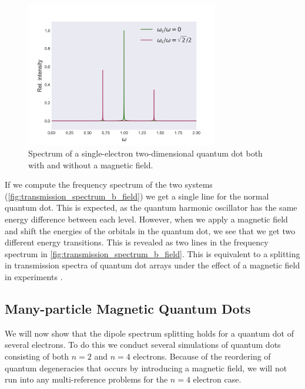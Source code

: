 \begin{figure}
    \centering
    \includegraphics[width=0.75\textwidth]{results/figures/transmission_spectrum.png}
    \caption{Spectrum of a single-electron two-dimensional quantum dot both with and
        without a magnetic field.
    }
    \label{fig:transmission_spectrum_b_field}
\end{figure}

If we compute the frequency spectrum of the two systems
(\autoref{fig:transmission_spectrum_b_field}) we get a single line for the 
normal quantum dot. This is expected, as the quantum harmonic oscillator has 
the same energy difference between each level. However, when we apply a magnetic
field and shift the energies of the orbitals in the quantum dot, we see that we 
get two different energy transitions. This is revealed as two lines in the 
frequency spectrum in \autoref{fig:transmission_spectrum_b_field}. This is equivalent 
to a splitting in transmission spectra of quantum dot arrays under the effect 
of a magnetic field in experiments \cite{heitmann1993spectroscopy,meurer1992single}.

\subsection{Many-particle Magnetic Quantum Dots}

We will now show that the dipole spectrum splitting holds for a quantum dot of 
several electrons. To do this we conduct several simulations of quantum dots consisting 
of both $n=2$ and $n=4$ electrons. Because of the reordering of quantum degeneracies 
that occurs by introducing a magnetic field, we will not run into any multi-reference 
problems for the $n=4$ electron case.

